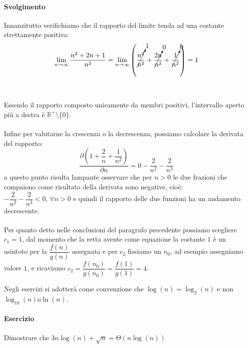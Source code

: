 \documentclass[11pt,a4paper,oneside]{article}
\begin{document}
\paragraph*{Svolgimento} Innanzitutto verifichiamo che il rapporto del limite tenda ad una costante strettamente positiva: $$\lim_{n\to \infty} \dfrac{n^2+2n+1}{n^2} = \lim_{n\to \infty} \left( \cancelto{1}{\dfrac{n^2}{n^2}} + \cancelto{0}{\dfrac{2n}{n^2}} + \cancelto{0}{\dfrac{1}{n^2}}\right) = 1$$\\\\Essendo il rapporto composto unicamente da membri positivi, l'intervallo aperto più a destra è $\mathbb{R}^{+}\setminus{\{0\}}$.\\\\Infine per valutarne la crescenza o la decrescenza, possiamo calcolare la derivata del rapporto:
$$\dfrac{\partial \left(1+\dfrac{2}{n}+\dfrac{1}{n^2} \right)}{\partial n} = 0 - \dfrac{2}{n^2} - \dfrac{2}{n^3}$$
a questo punto risulta lampante osservare che per $n > 0$ le due frazioni che compaiono come risultato della derivata sono negative, cioè: $-\dfrac{2}{n^2} -\dfrac{2}{n^3}<0,\,\forall n > 0$ e quindi il rapporto delle due funzioni ha un andamento decrescente.\\\\Per quanto detto nelle conclusioni del paragrafo precedente possiamo scegliere $c_1 = 1$, dal momento che la retta avente come equazione la costante $1$ è un asintoto per la $\dfrac{f(n)}{g(n)}$ assegnata e per $c_2$ fissiamo un $n_0$, ad esempio assegniamo valore $1$, e ricaviamo $c_2 = \dfrac{f(n_0)}{g(n_0)} = \dfrac{f(1)}{g(1)} = 4$.

\begin{tcolorbox}[title=Attenzione]
	Negli esercizi si adotterà come convenzione che $\log(n) = \log_2(n)$ e non $\log_{10}(n) o \ln(n)$.
\end{tcolorbox}

\pagebreak
\paragraph*{Esercizio} Dimostrare che $3n\log(n) + \sqrt{n} =  \Theta(n\log(n))$
\end{document}
